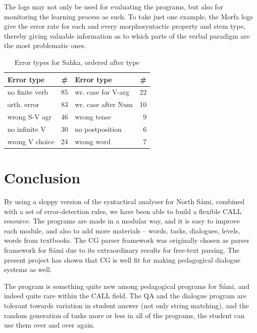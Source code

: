 \documentclass[11pt]{article}
\begin{document}
The logs may not only be used for evaluating the programs, but also for monitoring the learning process as such. To take just one example, the Morfa logs give the error rate for each and every morphosyntactic property and stem type, thereby giving valuable information as to which parts of the verbal paradigm are the most problematic ones.

\begin{table}[htdp]
\caption{Error types for Sahka, ordered after type}
\begin{center}
\begin{tabular}{|l|r|l|r|}
\hline
Error type & \# & Error type & \# \\
\hline												    
no finite verb    & 85 & wr. case for V-arg & 22  \\
orth. error       & 83 & wr. case after Num & 10 \\
wrong S-V agr     & 46 & wrong tense          & 9 \\
no infinite V  & 30 & no postposition      & 6 \\
wrong V choice & 24 & wrong word           & 7  \\
\hline
\end{tabular}
\end{center}
\label{log}
\end{table}%

\section{Conclusion}

By using a sloppy version of the syntactical analyser for North Sámi, combined with a set of error-detection rules, we have been able to build a flexible CALL resource. The programs are made in a  modular way, and it is easy to improve each module, and also to add more materials -- words, tasks, dialogues, levels, words from textbooks. The CG parser framework was originally chosen as parser framework for Sámi due to its extraordinary results for free-text parsing. The present project has shown that CG is well fit for making pedagogical dialogue systems as well.

The program is something quite new among pedagogical programs for Sámi, and indeed quite rare within the CALL field. %
The QA and the dialogue program are tolerant towards variation in student answer (not only string matching), and the random generation of tasks more or less in all of the programs, the student can use them over and over again. 
\end{document}
